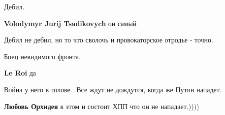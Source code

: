 \begin{itemize}
Дебил.

\begin{itemize}
 
\textbf{Volodymyr Jurij Tsadikovych} он самый

 
Дебил не дебил, но то что сволочь и провокаторское отродье - точно.
\end{itemize}

 
Боец невидимого фронта.

\begin{itemize}
 
\textbf{Le Roi} да
\end{itemize}

 
Война у него в голове.. Все ждут не дождутся, когда же Путин нападет.

\begin{itemize}
 
\textbf{Любовь Орхидея} в этом и состоит ХПП что он не нападает.))))


\end{itemize}
\end{itemize}
